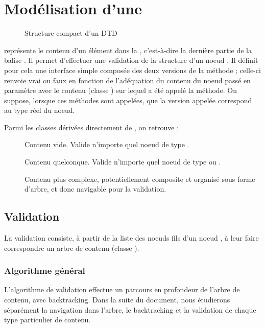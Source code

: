 \newcommand{\browseUp}{$self.browseUp(nextStep, firstNodeIterator, endNodeIterator)$\xspace}
\newcommand{\browseDown}{$self.browseDown(child, firstNodeIterator, endNodeIterator, self)$\xspace}

\section{Modélisation d'une \dtd}
\begin{figure}[H]
  \caption{Structure compact d'un DTD}
\end{figure}
 représente le contenu d'un élément dans la \dtd, c'est-à-dire la dernière partie de la balise . Il permet d'effectuer une validation de la structure d'un noeud \xml. Il définit pour cela une interface simple composée des deux versions de la méthode  ; celle-ci renvoie vrai ou faux en fonction de l'adéquation du contenu du noeud passé en paramètre avec le contenu (classe ) sur lequel a été appelé la méthode. On suppose, lorsque ces méthodes sont appelées, que la version appelée correspond au type réel du noeud.

Parmi les classes dérivées directement de , on retrouve :
\begin{description}
\item[] Contenu vide. Valide n'importe quel noeud de type .
\item[] Contenu quelconque. Valide n'importe quel noeud de type  ou .
\item[] Contenu plus complexe, potentiellement composite et organisé sous forme d'arbre, et donc navigable pour la validation.
\end{description}


\subsection{Validation}
La validation consiste, à partir de la liste des noeuds fils d'un noeud \xml, à leur faire correspondre un arbre de contenu (classe ).

\subsubsection{Algorithme général}
L'algorithme de validation effectue un parcours en profondeur de l'arbre de contenu, avec backtracking. Dans la suite du document, nous étudierons séparément la navigation dans l'arbre, le backtracking et la validation de chaque type particulier de contenu.

